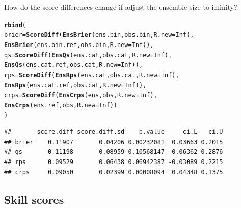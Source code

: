 \documentclass[article]{jss}\usepackage{graphicx, color}
\makeatletter
\newcommand{\hlfunctioncall}[1]{\textcolor[rgb]{0,0.501960784313725,0.752941176470588}{\textbf{#1}}}%
\newenvironment{kframe}{%
 \def\at@end@of@kframe{}%
 \ifinner\ifhmode%
  \def\at@end@of@kframe{\end{minipage}}%
  \begin{minipage}{\columnwidth}%
 \fi\fi%
 \def\FrameCommand##1{\hskip\@totalleftmargin \hskip-\fboxsep
 \colorbox{shadecolor}{##1}\hskip-\fboxsep
     \hskip-\linewidth \hskip-\@totalleftmargin \hskip\columnwidth}%
 \MakeFramed {\advance\hsize-\width
   \@totalleftmargin\z@ \linewidth\hsize
   \@setminipage}}%
 {\par\unskip\endMakeFramed%
 \at@end@of@kframe}
\newenvironment{knitrout}{}{} %
\makeatother
\begin{document}
How do the score differences change if adjust the ensemble size to infinity?

\begin{knitrout}
\color{fgcolor}\begin{kframe}
\begin{alltt}
\hlfunctioncall{rbind}(
  brier = \hlfunctioncall{ScoreDiff}(\hlfunctioncall{EnsBrier}(ens.bin,     obs.bin, R.new=Inf), 
                    \hlfunctioncall{EnsBrier}(ens.bin.ref, obs.bin, R.new=Inf)),
  qs    = \hlfunctioncall{ScoreDiff}(\hlfunctioncall{EnsQs}(ens.cat,     obs.cat, R.new=Inf), 
                    \hlfunctioncall{EnsQs}(ens.cat.ref, obs.cat, R.new=Inf)),
  rps   = \hlfunctioncall{ScoreDiff}(\hlfunctioncall{EnsRps}(ens.cat,     obs.cat, R.new=Inf), 
                    \hlfunctioncall{EnsRps}(ens.cat.ref, obs.cat, R.new=Inf)),
  crps  = \hlfunctioncall{ScoreDiff}(\hlfunctioncall{EnsCrps}(ens,     obs, R.new=Inf),  
                    \hlfunctioncall{EnsCrps}(ens.ref, obs, R.new=Inf))
)
\end{alltt}
\begin{verbatim}
##       score.diff score.diff.sd    p.value     ci.L   ci.U
## brier    0.11907       0.04206 0.00232081  0.03663 0.2015
## qs       0.11198       0.08959 0.10568147 -0.06362 0.2876
## rps      0.09529       0.06438 0.06942387 -0.03089 0.2215
## crps     0.09050       0.02399 0.00008094  0.04348 0.1375
\end{verbatim}
\end{kframe}
\end{knitrout}



\subsection{Skill scores}
\end{document}
